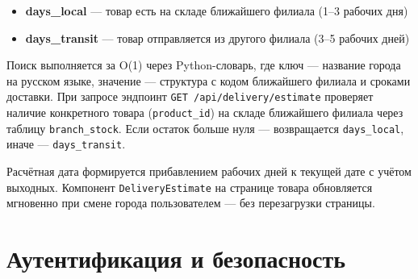 \documentclass[14pt,a4paper]{extreport}
\begin{document}
\begin{itemize}
  \item \textbf{days\_local} --- товар есть на складе ближайшего филиала (1--3 рабочих дня)
  \item \textbf{days\_transit} --- товар отправляется из другого филиала (3--5 рабочих дней)
\end{itemize}

Поиск выполняется за O(1) через Python-словарь, где ключ — название города на русском языке, значение — структура с кодом ближайшего филиала и сроками доставки. При запросе эндпоинт \texttt{GET /api/delivery/estimate} проверяет наличие конкретного товара (\texttt{product\_id}) на складе ближайшего филиала через таблицу \texttt{branch\_stock}. Если остаток больше нуля — возвращается \texttt{days\_local}, иначе — \texttt{days\_transit}.

Расчётная дата формируется прибавлением рабочих дней к текущей дате с учётом выходных. Компонент \texttt{DeliveryEstimate} на странице товара обновляется мгновенно при смене города пользователем — без перезагрузки страницы.

\begin{table}[h!]
\centering
\caption{Примеры сопоставления городов с филиалами}
\end{table}

\section{Аутентификация и безопасность}
\end{document}
